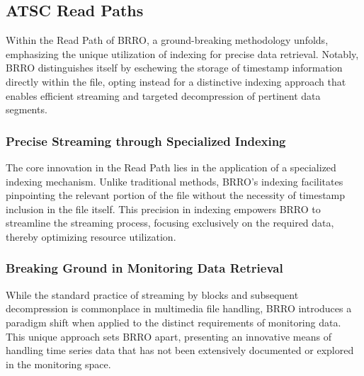 \documentclass[conference]{IEEEtran}
\begin{document}
\subsection{ATSC Read Paths}

Within the Read Path of BRRO, a ground-breaking methodology unfolds, emphasizing the unique utilization of indexing for precise data retrieval. Notably, BRRO distinguishes itself by eschewing the storage of timestamp information directly within the file, opting instead for a distinctive indexing approach that enables efficient streaming and targeted decompression of pertinent data segments.

\vspace{10pt}
\subsubsection{Precise Streaming through Specialized Indexing}\label{SCM}
The core innovation in the Read Path lies in the application of a specialized indexing mechanism. Unlike traditional methods, BRRO's indexing facilitates pinpointing the relevant portion of the file without the necessity of timestamp inclusion in the file itself. This precision in indexing empowers BRRO to streamline the streaming process, focusing exclusively on the required data, thereby optimizing resource utilization. 

\vspace{10pt}
\subsubsection{Breaking Ground in Monitoring Data Retrieval}\label{SCM}
While the standard practice of streaming by blocks and subsequent decompression is commonplace in multimedia file handling, BRRO introduces a paradigm shift when applied to the distinct requirements of monitoring data. This unique approach sets BRRO apart, presenting an innovative means of handling time series data that has not been extensively documented or explored in the monitoring space. 

\vspace{10pt}
\end{document}
